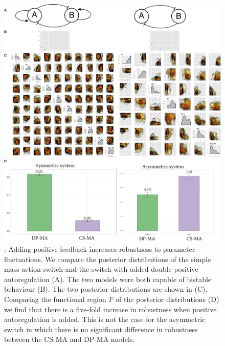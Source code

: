 \begin{figure}[h]
\begin{center}
\includegraphics[scale=0.5]{chapterStabilityFinder/images/figure-04.png}
\caption[LoF caption]{ \label{fig:fig4}: Adding positive feedback increases robustness to parameter fluctuations. We compare the posterior distributions of the simple mass action switch and the switch with added double positive autoregulation (A). The two models were both capable of bistable behaviour (B). The two posterior distributions are shown in (C). Comparing the functional region $F$ of the posterior distributions (D) we find that there is a five-fold increase in robustness when positive autoregulation is added. This is not the case for the asymmetric switch in which there is no significant difference in robustness between the CS-MA and DP-MA models.}
\end{center}
\end{figure}
\clearpage


